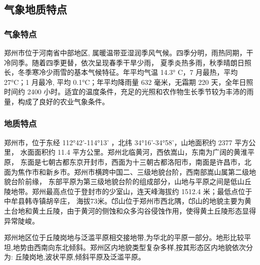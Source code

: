 \subsection{气象地质特点}
\subsubsection{气象特点}

郑州市位于河南省中部地区, 属暖温带亚湿润季风气候。四季分明，雨热同期，干冷同季。随着四季更替，依次呈现春季干旱少雨，
夏季炎热多雨，秋季晴朗日照长，冬季寒冷少雨雪的基本气候特征。年平均气温 14.3° C，7 月最热，平均 27°C；1 月最冷,
平均 0.1°C；年平均降雨量 632 毫米，无霜期 220 天，全年日照时间约 2400 小时。适宜的温度条件，充足的光照和农作物生长季节较为丰沛的雨量，构成了良好的农业气象条件。

\subsubsection{地质特点}

郑州市，位于东经 112°42'-114°13' ，北纬 34°16'-34°58'，山地面积约 2377 平方公里， 水面面积约 11.4 平方公里。郑州北临黄河，西依嵩山，东南为广阔的黄淮平原，
东面是七朝古都东京开封市，西面为十三朝古都洛阳市，南面是许昌市，北面为焦作市和新乡市。郑州市横跨中国二、三级地貌台阶，西南部嵩山属第二级地貌台阶前缘，
东部平原为第三级地貌台阶的组成部分，山地与平原之间是低山丘陵地带。郑州最高点位于登封市的少室山，连天峰海拔约 1512.4 米；最低点位于中牟县韩寺镇胡辛庄，
海拔73米。邙山位于郑州市西北隅，邙山的地貌主要为黄土台地和黄土丘陵，由于黄河的侧蚀和众多沟谷侵蚀作用，使得黄土丘陵形态显得异常陡峻。

郑州地区位于丘陵岗地与泛滥平原相交接地带,为华北的平原一部分。地形比较平坦,地势由西南向东北倾斜。郑州区内地貌类型复杂多样,按其形态区内地貌依次分为:
丘陵岗地,波状平原,倾斜平原及泛滥平原。